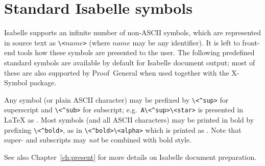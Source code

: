 

\chapter{Standard Isabelle symbols}\label{app:symbols}

Isabelle supports an infinite number of non-ASCII symbols, which are
represented in source text as \verb,\<,$name$\verb,>, (where $name$ may be any
identifier).  It is left to front-end tools how these symbols are presented to
the user.  The following predefined standard symbols are available by default
for Isabelle document output; most of these are also supported by
Proof~General when used together with the X-Symbol package.

Any symbol (or plain ASCII character) may be prefixed by \verb,\<^sup>, for
superscript and \verb,\<^sub>, for subscript; e.g.\ \verb,A\<^sup>\<star>, is
presented in {\LaTeX} as .  Most symbols (and
all ASCII characters) may be printed in bold by prefixing \verb,\<^bold>,, as
in \verb,\<^bold>\<alpha>, which is printed as
\isa{\isactrlbold{\isasymalpha}}.  Note that super- and subscripts may
\emph{not} be combined with bold style.

See also Chapter~\ref{ch:present} for more details on Isabelle document
preparation.

\begin{center}
    
\end{center}

